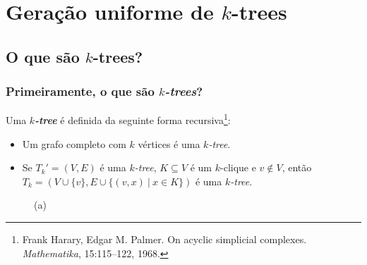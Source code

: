 \documentclass{beamer}
\begin{document}
  \section{Geração uniforme de $k$-trees}

  \subsection{O que são $k$-trees?}

  \begin{frame}
    \frametitle{Primeiramente, o que são \emph{$k$-trees}?}

    Uma \textbf{\emph{$k$-tree}} é definida da seguinte forma recursiva\footnote{\scriptsize Frank Harary, Edgar M. Palmer. On acyclic simplicial complexes. \emph{Mathematika}, 15:115--122, 1968.}:

    \begin{itemize}
      \item Um grafo completo com $k$ vértices é uma \emph{$k$-tree}.
      \item Se $T_k' = (V, E)$ é uma \emph{$k$-tree}, $K \subseteq V$ é um $k$-clique e $v \not \in V$, então $T_k = (V \cup \{v\}, E \cup \{(v,x) \ | \  x \in K\})$ é uma \emph{$k$-tree}.
    \end{itemize}

    \begin{figure}
      \begin{minipage}{0.3333\textwidth}
        \centering

        (a)
      \end{minipage}\begin{minipage}{0.3333\textwidth}
        \centering
\end{minipage}
\end{figure}
\end{frame}
\end{document}
